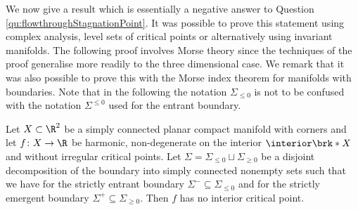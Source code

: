 We now give a result which is essentially a negative answer to Question \ref{qu:flowthroughStagnationPoint}.
It was possible to prove this statement using complex analysis, level sets of critical points or alternatively using invariant manifolds.
The following proof involves Morse theory since the techniques of the proof generalise more readily to the three dimensional case.
We remark that it was also possible to prove this with the Morse index theorem for manifolds with boundaries.
Note that in the following the notation $\Sigma_{\leq0}$ is not to be confused with the notation $\Sigma^{\leq0}$ used for the
entrant boundary.
\begin{proposition}[Negative answer to Question \ref{qu:flowthroughStagnationPoint} in $d=2$ dimensions]\label{pr:n2_negativeResult}
  Let $X\subset\R^2$ be a simply connected planar compact manifold with corners and let $f\colon X\to\R$ be harmonic, non-degenerate on the interior
  $\interior\brk*{X}$ and without irregular critical points.
  Let $\Sigma=\Sigma_{\leq0}\sqcup\Sigma_{\geq0}$ be a disjoint decomposition of the boundary into simply connected nonempty sets such that
  we have for the strictly entrant boundary $\Sigma^-\subseteq\Sigma_{\leq0}$ and for the strictly emergent boundary $\Sigma^+\subseteq\Sigma_{\geq0}$.
  Then $f$ has no interior critical point.
\end{proposition}

